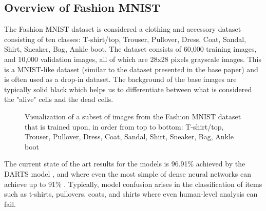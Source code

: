 \documentclass[conference]{IEEEtran}
\begin{document}
\subsection{Overview of Fashion MNIST}

The Fashion MNIST dataset is considered a clothing and accessory dataset consisting of ten classes: T-shirt/top, Trouser, Pullover, Dress, Coat, Sandal, Shirt, Sneaker, Bag, Ankle boot. The dataset consists of 60,000 training images, and 10,000 validation images, all of which are 28x28 pixels grayscale images. This is a MNIST-like dataset (similar to the dataset presented in the base paper) and is often used as a drop-in dataset. The background of the base images are typically solid black which helps us to differentiate between what is considered the "alive" cells and the dead cells. 

\begin{figure}[htbp]
\caption{ Visualization of a subset of images from the Fashion MNIST dataset that is trained upon, in order from top to bottom: T-shirt/top, Trouser, Pullover, Dress, Coat, Sandal, Shirt, Sneaker, Bag, Ankle boot } 
\end{figure}

The current state of the art results for the models is 96.91\% achieved by the DARTS model \cite{Darts}, and where even the most simple of dense neural networks can achieve up to 91\% \cite{tf_fmnist}. Typically, model confusion arises in the classification of items such as t-shirts, pullovers, coats, and shirts where even human-level analysis can fail.
\end{document}
